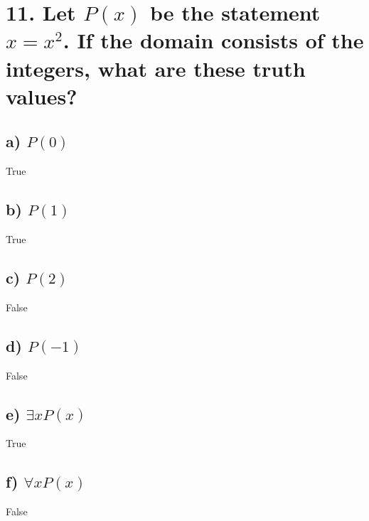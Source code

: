 \documentclass[11pt, oneside]{article} %
\numberwithin{equation}{section} %
\numberwithin{figure}{section} %
\numberwithin{table}{section} %
\begin{document}
\begin{table}[!htp]
\section{11. Let $P(x)$ be the statement ${x = x^2}$. If the domain consists of the integers, what are these truth values?}
\subsection{a) $P(0)$}
True
\subsection{b) $P(1)$}
True
\subsection{c) $P(2)$}
False
\subsection{d) $P(-1)$}
False
\subsection{e) $\exists$$xP(x)$}
True
\subsection{f) $\forall$$xP(x)$}
False

\end{table}
\end{document}
